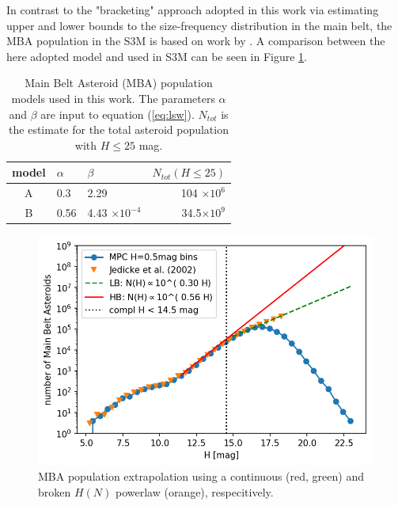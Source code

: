 In contrast to the "bracketing" approach adopted in this work via estimating upper and lower bounds to the size-frequency distribution in the main belt, the MBA population in the S3M is based on work by \citet{jedicke2002}. A comparison between the here adopted model and \citet{jedicke2002} used in S3M can be seen in Figure \ref{fig:mba_pop}.
\begin{table}[t!]
\begin{center}
\begin{tabular}{cllr}
\hline
model & $\alpha$ & $\beta$ & $N_{tot}(H \le 25)$ \\
\hline
A & 0.3 &  2.29 & 104 $\times 10^{6}$ \\
B & 0.56 &4.43 $\times 10^{-4}$ & 34.5$\times 10^{9}$\\
\hline
\end{tabular}
\end{center}
\caption{Main Belt Asteroid (MBA) population models used in this work. The parameters $\alpha$ and $\beta$ are input to equation (\ref{eq:lsw}). $N_{tot}$ is the estimate for the total asteroid population with $H\le 25$ mag. }
\label{tab:mbapop}
\end{table}
\begin{figure}[b!]
\begin{center}
\includegraphics[scale=.8]{figs/mpc_population_4.png}
\end{center}
\caption{MBA population extrapolation using a continuous (red, green) and broken $H(N)$ powerlaw (orange), respecitively.}
\label{fig:mba_pop}       %
\end{figure} 


